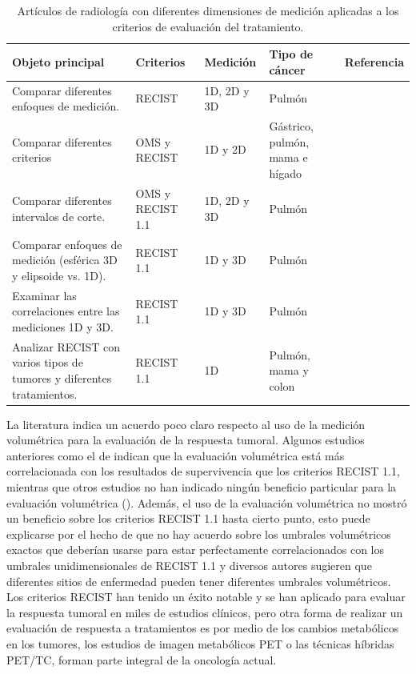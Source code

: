 \documentclass[11pt,a4paper,openany]{article}
\begin{document}
    \begin{table}[h]
        \caption{Artículos de radiología con diferentes dimensiones de medición aplicadas a los criterios de evaluación del tratamiento.\label{tab:MEASUDIMENSIONS}}
        \begin{tabular}{p{4cm} p{2.5cm} l p{2.2cm} l}
        \hline
        \bf{Objeto principal} & \bf{Criterios} & \bf{Medición} & \bf{Tipo de cáncer} & \bf{Referencia} \\
        \hline
        Comparar diferentes enfoques de medición. & RECIST & 1D, 2D y 3D & Pulmón & \cite{WernerWasik2001} \\
        \hline
        Comparar diferentes criterios & OMS y RECIST & 1D y 2D & Gástrico, pulmón, mama e hígado& \cite{Park2003} \\
        \hline
        Comparar diferentes intervalos de corte. & OMS y RECIST 1.1 & 1D, 2D y 3D & Pulmón & \cite{Zhao2013} \\
        \hline
        Comparar enfoques de medición (esférica 3D y elipsoide vs. 1D). & RECIST 1.1 & 1D y 3D & Pulmón & \cite{Petrick2014} \\
        \hline
        Examinar las correlaciones entre las mediciones 1D y 3D. & RECIST 1.1 & 1D y 3D & Pulmón & \cite{Hayes2016} \\
        \hline
        Analizar RECIST con varios tipos de tumores y diferentes tratamientos. & RECIST 1.1 & 1D & Pulmón, mama y colon & \cite{litiere2019} \\
        \hline
        \end{tabular}
        \end{table}

        La literatura indica un acuerdo poco claro respecto al uso de la medición volumétrica para la evaluación de la respuesta tumoral. Algunos estudios anteriores como el de \cite{Hayes2016} indican que la evaluación volumétrica está más correlacionada con los resultados de supervivencia que los criterios RECIST 1.1, mientras que otros estudios no han indicado ningún beneficio particular para la evaluación volumétrica (\cite{WernerWasik2001}). Además, el uso de la evaluación volumétrica no mostró un beneficio sobre los criterios RECIST 1.1 hasta cierto punto, esto puede explicarse por el hecho de que no hay acuerdo sobre los umbrales volumétricos exactos que deberían usarse para estar perfectamente correlacionados con los umbrales unidimensionales de RECIST 1.1 y diversos autores sugieren que diferentes sitios de enfermedad pueden tener diferentes umbrales volumétricos. Los criterios RECIST han tenido un éxito notable y se han aplicado para evaluar la respuesta tumoral en miles de estudios clínicos,  pero otra forma de realizar un evaluación de respuesta a tratamientos es por medio de los cambios metabólicos en los tumores, los estudios de imagen metabólicos PET o las técnicas híbridas PET/TC, forman parte integral de la oncología actual.\\
\end{document}
